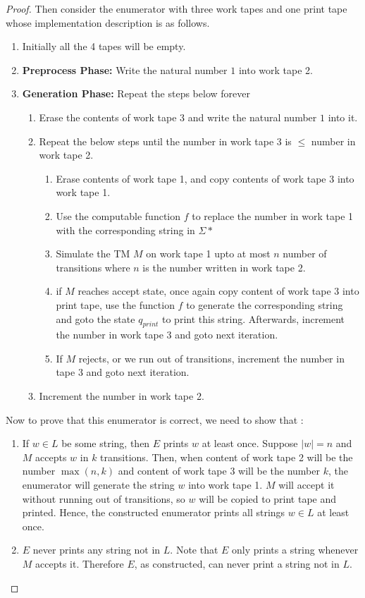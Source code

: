\begin{soln}
\begin{proof}
Then consider the enumerator with three work tapes and one print tape whose implementation description is as follows.
\begin{enumerate}
    \item Initially all the 4 tapes will be empty.
    \item \textbf{Preprocess Phase: } Write the natural number $1$ into work tape 2.
    \item \textbf{Generation Phase: } Repeat the steps below forever
    \begin{enumerate}
        \item Erase the contents of work tape 3 and write the natural number $1$ into it.
        \item Repeat the below steps until the number in work tape 3 is $\leq$ number in work tape 2.
        \begin{enumerate}
            \item Erase contents of work tape 1, and copy contents of work tape 3 into work tape 1.
            \item Use the computable function $f$ to replace the number in work tape 1 with the corresponding string in $\Sigma*$
            \item Simulate the TM $M$ on work tape 1 upto at most $n$ number of transitions where $n$ is the number written in work tape 2.
            \item if $M$ reaches accept state, once again copy content of work tape 3 into print tape, use the function $f$ to generate the corresponding string and goto the state $q_{print}$ to print this string. Afterwards, increment the number in work tape 3 and goto next iteration.
            \item If $M$ rejects, or we run out of transitions, increment the number in tape 3 and goto next iteration.
        \end{enumerate}
        \item Increment the number in work tape 2.
    \end{enumerate}
\end{enumerate}

Now to prove that this enumerator is correct, we need to show that :
\begin{enumerate}
    \item If $w \in L$ be some string, then $E$ prints $w$ at least once. Suppose $|w| = n$ and $M$ accepts $w$ in $k$ transitions. Then, when content of work tape 2 will be the number $\max(n, k)$ and content of work tape 3 will be the number $k$, the enumerator will generate the string $w$ into work tape 1. $M$ will accept it without running out of transitions, so $w$ will be copied to print tape and printed. Hence, the constructed enumerator prints all strings $w \in L$ at least once.
    \item $E$ never prints any string not in $L$. Note that $E$ only prints a string whenever $M$ accepts it. Therefore $E$, as constructed, can never print a string not in $L$.
\end{enumerate}
\end{proof}
\end{soln}